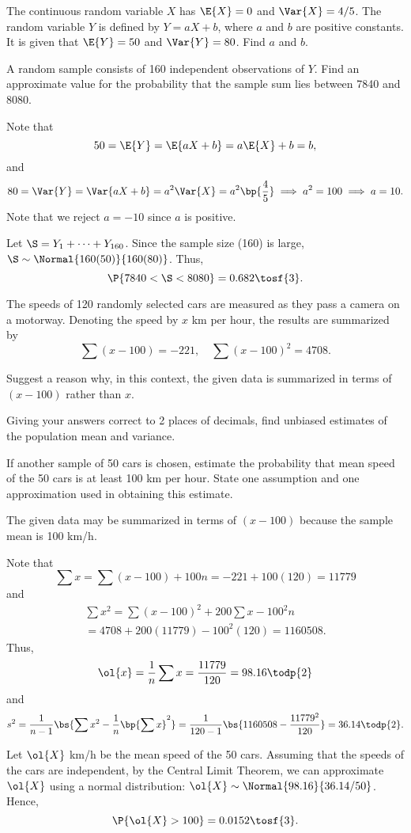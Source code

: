 \begin{problem}
    The continuous random variable $X$ has $\E{X} = 0$ and $\Var{X} = 4/5$. The random variable $Y$ is defined by $Y=aX+b$, where $a$ and $b$ are positive constants. It is given that $\E{Y}=50$ and $\Var{Y}=80$. Find $a$ and $b$.

    A random sample consists of 160 independent observations of $Y$. Find an approximate value for the probability that the sample sum lies between 7840 and 8080.
\end{problem}
\begin{solution}
    Note that \[50 = \E{Y} = \E{aX + b} = a\E{X} + b = b,\] and \[80 = \Var{Y} = \Var{aX+b} = a^2 \Var{X} = a^2 \bp{\frac45} \implies a^2 = 100 \implies a = 10.\] Note that we reject $a = -10$ since $a$ is positive.

    Let $\S = Y_1 + \dots + Y_{160}$. Since the sample size (160) is large, $\S \sim \Normal{160(50)}{160(80)}$. Thus, \[\P{7840 < \S < 8080} = 0.682 \tosf{3}.\]
\end{solution}

\begin{problem}
    The speeds of 120 randomly selected cars are measured as they pass a camera on a motorway. Denoting the speed by $x$ km per hour, the results are summarized by \[\sum (x - 100) = -221, \quad \sum (x - 100)^2 = 4708.\] 
    
    Suggest a reason why, in this context, the given data is summarized in terms of $(x-100)$ rather than $x$.

    Giving your answers correct to 2 places of decimals, find unbiased estimates of the population mean and variance.

    If another sample of 50 cars is chosen, estimate the probability that mean speed of the 50 cars is at least 100 km per hour. State one assumption and one approximation used in obtaining this estimate.
\end{problem}
\begin{solution}
    The given data may be summarized in terms of $(x-100)$ because the sample mean is 100 km/h.

    Note that \[\sum x = \sum (x-100) + 100n = -221 + 100(120) = 11779\] and
    \begin{gather*}
        \sum x^2 = \sum (x-100)^2 + 200 \sum x - 100^2n\\
        = 4708 + 200(11779) - 100^2 (120) = 1160508.    
    \end{gather*}
    Thus, \[\ol{x} = \frac1n \sum x = \frac{11779}{120} = 98.16 \todp{2}\] and \[s^2 = \frac1{n-1} \bs{\sum x^2 - \frac1n \bp{\sum x}^2} = \frac{1}{120 - 1} \bs{1160508 - \frac{11779^2}{120}} = 36.14 \todp{2}.\]

    Let $\ol{X}$ km/h be the mean speed of the 50 cars. Assuming that the speeds of the cars are independent, by the Central Limit Theorem, we can approximate $\ol{X}$ using a normal distribution: $\ol{X} \sim \Normal{98.16}{36.14/50}$. Hence, \[\P{\ol{X} > 100} = 0.0152 \tosf{3}.\]
\end{solution}

